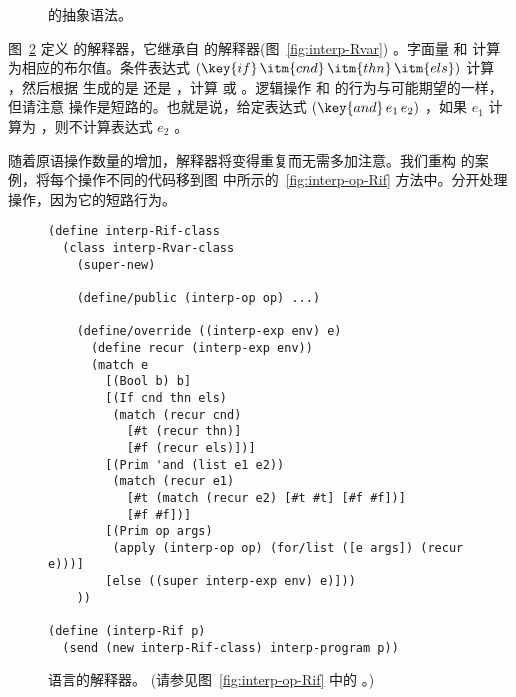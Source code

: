 \documentclass[11pt]{book}
\newcommand{\gray}[1]{{\color{gray} #1}}
\begin{document}
\begin{figure}[tp]
\centering
\fbox{
\begin{minipage}{0.96\textwidth}
\[
\begin{array}{lcl}
  \itm{bool} &::=& \code{\#t} \mid \code{\#f} \\
  \itm{cmp} &::= & \code{eq?} \mid \code{<} \mid \code{<=} \mid \code{>} \mid \code{>=} \\
  \itm{op} &::= & \itm{cmp} \mid \code{read} \mid \code{+} \mid \code{-}
    \mid \code{and} \mid \code{or} \mid \code{not} \\
  \Exp &::=& \gray{ \INT{\Int} \mid \VAR{\Var} \mid \LET{\Var}{\Exp}{\Exp} } \\
     &\mid& \PRIM{\itm{op}}{\Exp\ldots}\\
     &\mid& \BOOL{\itm{bool}} \mid \IF{\Exp}{\Exp}{\Exp} \\
  \LangIf{} &::=& \PROGRAM{\code{'()}}{\Exp}
\end{array}
\]
\end{minipage}
}
\caption{ \LangIf{} 的抽象语法。}
\label{fig:Rif-syntax}
\end{figure}

图~\ref{fig:interp-Rif} 定义 \LangIf{} 的解释器，它继承自 \LangVar{}
的解释器(图~\ref{fig:interp-Rvar}) 。字面量  和 
计算为相应的布尔值。条件表达式 $(\key{if}\, \itm{cnd}\,\itm{thn}\,\itm{els})$ 计算
 ，然后根据  生成的是  还是  ，计算  或  。逻辑操作  和  的行为与可能期望的一样，但请注意  操作是短路的。也就是说，给定表达式 $(\key{and}\,e_1\,e_2)$ ，如果 $e_1$ 计算为  ，则不计算表达式 $e_2$ 。

随着原语操作数量的增加，解释器将变得重复而无需多加注意。我们重构  的案例，将每个操作不同的代码移到图  中所示的~\ref{fig:interp-op-Rif} 方法中。分开处理  操作，因为它的短路行为。

\begin{figure}[tbp]
\begin{lstlisting}
(define interp-Rif-class
  (class interp-Rvar-class
    (super-new)

    (define/public (interp-op op) ...)

    (define/override ((interp-exp env) e)
      (define recur (interp-exp env))
      (match e
        [(Bool b) b]
        [(If cnd thn els)
         (match (recur cnd)
           [#t (recur thn)]
           [#f (recur els)])]
        [(Prim 'and (list e1 e2))
         (match (recur e1)
           [#t (match (recur e2) [#t #t] [#f #f])]
           [#f #f])]
        [(Prim op args)
         (apply (interp-op op) (for/list ([e args]) (recur e)))]
        [else ((super interp-exp env) e)]))
    ))

(define (interp-Rif p)
  (send (new interp-Rif-class) interp-program p))
\end{lstlisting}
\caption{ \LangIf{} 语言的解释器。 (请参见图~\ref{fig:interp-op-Rif} 中的  。)}
\label{fig:interp-Rif}
\end{figure}
\end{document}
